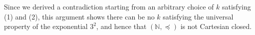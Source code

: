 Since we derived a contradiction starting from an arbitrary choice of \(k\) satisfying (1) and (2),
this argument shows
there can be no \(k\) satisfying the universal property of the exponential \(3^2\),
and hence that
$(\mathbb{N}, \preceq)$ is not Cartesian closed.






